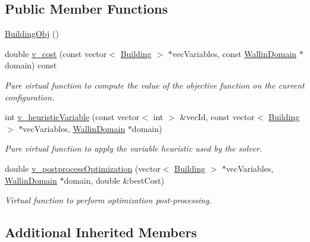 \subsection*{Public Member Functions}
\begin{DoxyCompactItemize}
\item 
\hyperlink{classghost_1_1BuildingObj_af478d2e0b3cb57d439108806ac746fab}{Building\-Obj} ()
\item 
double \hyperlink{classghost_1_1BuildingObj_a776e66ee83bea375f906aada814f791f}{v\-\_\-cost} (const vector$<$ \hyperlink{classghost_1_1Building}{Building} $>$ $\ast$vec\-Variables, const \hyperlink{classghost_1_1WallinDomain}{Wallin\-Domain} $\ast$domain) const 
\begin{DoxyCompactList}\small\item\em Pure virtual function to compute the value of the objective function on the current configuration. \end{DoxyCompactList}\item 
int \hyperlink{classghost_1_1BuildingObj_a472940adf4a07d5062376bc2f4a349d1}{v\-\_\-heuristic\-Variable} (const vector$<$ int $>$ \&vec\-Id, const vector$<$ \hyperlink{classghost_1_1Building}{Building} $>$ $\ast$vec\-Variables, \hyperlink{classghost_1_1WallinDomain}{Wallin\-Domain} $\ast$domain)
\begin{DoxyCompactList}\small\item\em Pure virtual function to apply the variable heuristic used by the solver. \end{DoxyCompactList}\item 
double \hyperlink{classghost_1_1BuildingObj_af6b0953277810bbb5a9edf1d38d657ba}{v\-\_\-postprocess\-Optimization} (vector$<$ \hyperlink{classghost_1_1Building}{Building} $>$ $\ast$vec\-Variables, \hyperlink{classghost_1_1WallinDomain}{Wallin\-Domain} $\ast$domain, double \&best\-Cost)
\begin{DoxyCompactList}\small\item\em Virtual function to perform optimization post-\/processing. \end{DoxyCompactList}\end{DoxyCompactItemize}
\subsection*{Additional Inherited Members}


